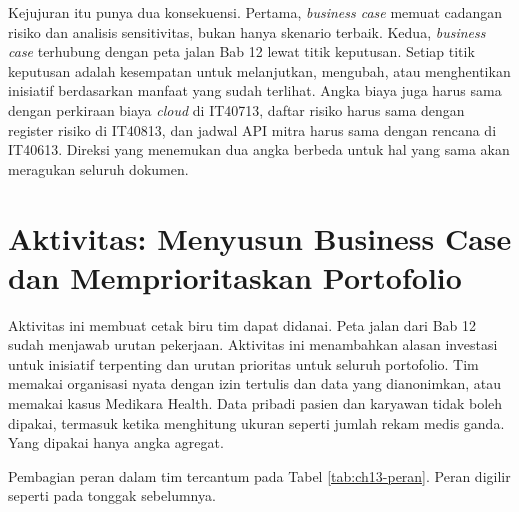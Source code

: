 Kejujuran itu punya dua konsekuensi. Pertama, \textit{business case} memuat
cadangan risiko dan analisis sensitivitas, bukan hanya skenario terbaik.
Kedua, \textit{business case} terhubung dengan peta jalan Bab 12 lewat titik
keputusan. Setiap titik keputusan adalah kesempatan untuk melanjutkan,
mengubah, atau menghentikan inisiatif berdasarkan manfaat yang sudah
terlihat. Angka biaya juga harus sama dengan perkiraan biaya \textit{cloud} di
IT40713, daftar risiko harus sama dengan register risiko di IT40813, dan
jadwal API mitra harus sama dengan rencana di IT40613. Direksi yang menemukan
dua angka berbeda untuk hal yang sama akan meragukan seluruh dokumen.

\let\sectionmarkasli\sectionmark
\renewcommand{\sectionmark}[1]{\sectionmarkasli{Aktivitas: Business Case dan Portofolio}}
\section{Aktivitas: Menyusun Business Case dan Memprioritaskan Portofolio}
\let\sectionmark\sectionmarkasli

Aktivitas ini membuat cetak biru tim dapat didanai. Peta jalan dari Bab 12
sudah menjawab urutan pekerjaan. Aktivitas ini menambahkan alasan investasi
untuk inisiatif terpenting dan urutan prioritas untuk seluruh portofolio.
Tim memakai organisasi nyata dengan izin tertulis dan data yang dianonimkan,
atau memakai kasus Medikara Health. Data pribadi pasien dan karyawan tidak
boleh dipakai, termasuk ketika menghitung ukuran seperti jumlah rekam medis
ganda. Yang dipakai hanya angka agregat.

Pembagian peran dalam tim tercantum pada Tabel \ref{tab:ch13-peran}. Peran
digilir seperti pada tonggak sebelumnya.

